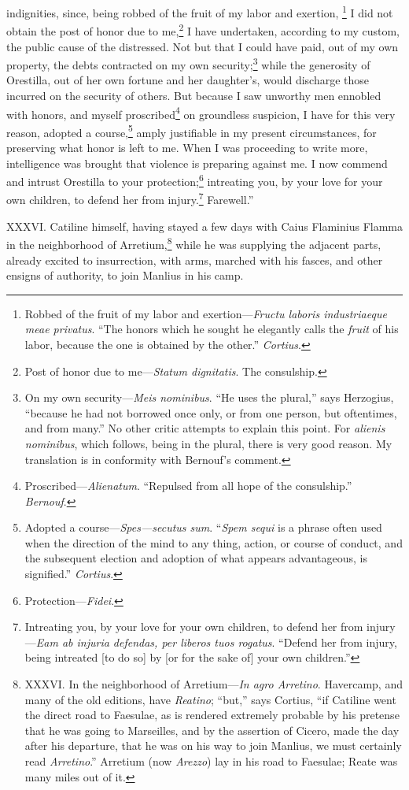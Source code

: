 indignities, since, being robbed of the fruit of my labor and exertion,
\footnote{Robbed of the fruit of my labor and exertion—\emph{Fructu laboris
industriaeque meae privatus}. ``The honors which he sought he
elegantly calls the \emph{fruit} of his labor, because the one is obtained
by the other.'' \emph{Cortius}.} I did not obtain the post of honor due to me,\footnote{Post of honor due to me—\emph{Statum dignitatis}. The consulship.} I have
undertaken, according to my custom, the public cause of the distressed.
Not but that I could have paid, out of my own property, the debts
contracted on my own security;\footnote{On my own security—\emph{Meis nominibus}. ``He uses the plural,''
says Herzogius, ``because he had not borrowed once only, or from one
person, but oftentimes, and from many.'' No other critic attempts to
explain this point. For \emph{alienis nominibus}, which follows, being in
the plural, there is very good reason. My translation is in conformity
with Bernouf's comment.} while the generosity of Orestilla,
out of her own fortune and her daughter's, would discharge those
incurred on the security of others. But because I saw unworthy men
ennobled with honors, and myself proscribed\footnote{Proscribed—\emph{Alienatum}. ``Repulsed from all hope of the
consulship.'' \emph{Bernouf}.} on groundless suspicion,
I have for this very reason, adopted a course,\footnote{Adopted a course—\emph{Spes—secutus sum}. ``\emph{Spem sequi} is a
phrase often used when the direction of the mind to any thing, action,
or course of conduct, and the subsequent election and adoption of what
appears advantageous, is signified.'' \emph{Cortius}.} amply justifiable
in my present circumstances, for preserving what honor is left to me.
When I was proceeding to write more, intelligence was brought that
violence is preparing against me. I now commend and intrust Orestilla
to your protection;\footnote{Protection—\emph{Fidei}.} intreating you, by your love for your own
children, to defend her from injury.\footnote{Intreating you, by your love for your own children, to defend
her from injury—\emph{Eam ab injuria defendas, per liberos tuos rogatus}.
``Defend her from injury, being intreated [to do so] by [or for the
sake of] your own children.''} Farewell.''

XXXVI. Catiline himself, having stayed a few days with Caius Flaminius
Flamma in the neighborhood of Arretium,\footnote{XXXVI. In the neighborhood of Arretium—\emph{In agro Arretino}.
Havercamp, and many of the old editions, have \emph{Reatino}; ``but,'' says
Cortius, ``if Catiline went the direct road to Faesulae, as is rendered
extremely probable by his pretense that he was going to Marseilles,
and by the assertion of Cicero, made the day after his departure, that
he was on his way to join Manlius, we must certainly read \emph{Arretino}.''
Arretium (now \emph{Arezzo}) lay in his road to Faesulae; Reate was many
miles out of it.} while he was supplying
the adjacent parts, already excited to insurrection, with arms,
marched with his fasces, and other ensigns of authority, to join
Manlius in his camp.

